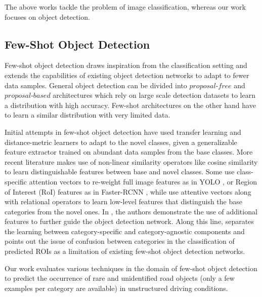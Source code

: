 \documentclass[letterpaper]{article} %
\begin{document}
The above works tackle the problem of image classification, whereas our work focuses on object detection.

\subsection{Few-Shot Object Detection}
\label{related:fsod}
Few-shot object detection draws inspiration from the classification setting and extends the capabilities of existing object detection networks \cite{yolo2,faster-rcnn} to adapt to fewer data samples. General object detection can be divided into $proposal$-$free$ \cite{yolo2,retinanet,polyyolo} and $proposal$-$based$ \cite{faster-rcnn,fpn} architectures which rely on large scale detection datasets to learn a distribution with high accuracy. Few-shot architectures on the other hand have to learn a similar distribution with very limited data.

Initial attempts in few-shot object detection have used transfer learning \cite{lstd} and distance-metric learners \cite{repmet} to adapt to the novel classes, given a generalizable feature extractor trained on abundant data samples from the base classes. More recent literature makes use of non-linear similarity operators like cosine similarity \cite{fsdet} to learn distinguishable features between base and novel classes. Some use class-specific attention vectors to re-weight full image features as in YOLO \cite{reweight}, or Region of Interest (RoI) features as in Faster-RCNN \cite{metarcnn}, while \cite{fgn,fsod} use attentive vectors along with relational operators \cite{relation-net} to learn low-level features that distinguish the base categories from the novel ones. In \cite{addfeat}, the authors demonstrate the use of additional features to further guide the object detection network. 
Along this line, \cite{metadet} separates the learning between category-specific and category-agnostic components and points out the issue of confusion between categories in the classification of predicted ROIs as a limitation of existing few-shot object detection networks. 

Our work evaluates various techniques in the domain of few-shot object detection to predict the occurrence of rare and unidentified road objects (only a few examples per category are available) in unstructured driving conditions.

\end{document}
